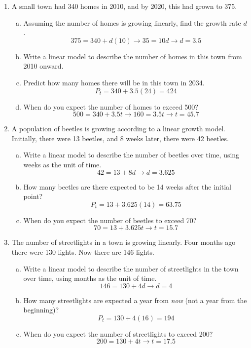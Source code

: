 \begin{enumerate}
\item A small town had 340 homes in 2010, and by 2020, this had grown to 375.
\begin{enumerate}[(a)]
\item Assuming the number of homes is growing linearly, find the growth rate $d$. 
\[375 = 340 + d(10) \longrightarrow 35 = 10d \longrightarrow d = 3.5\]
\item Write a linear model to describe the number of homes in this town from 2010 onward. 
\item Predict how many homes there will be in this town in 2034. 
\[P_t = 340 + 3.5(24) = 424\]
\item When do you expect the number of homes to exceed 500? 
\[500 = 340 + 3.5t \longrightarrow 160 = 3.5t \longrightarrow t = 45.7\]
\end{enumerate}

\item A population of beetles is growing according to a linear growth model.  Initially, there were 13 beetles, and 8 weeks later, there were 42 beetles.
\begin{enumerate}[(a)]
\item Write a linear model to describe the number of beetles over time, using weeks as the unit of time. 
\[42 = 13 + 8d \longrightarrow d = 3.625\]
\item How many beetles are there expected to be 14 weeks after the initial point? 
\[P_t = 13 + 3.625(14) = 63.75\]
\item When do you expect the number of beetles to exceed 70? 
\[70 = 13 + 3.625t \longrightarrow t = 15.7\]
\end{enumerate}

\item The number of streetlights in a town is growing linearly.  Four months ago there were 130 lights.  Now there are 146 lights.
\begin{enumerate}[(a)]
\item Write a linear model to describe the number of streetlights in the town over time, using months as the unit of time. 
\[146 = 130 + 4d \longrightarrow d = 4\]
\item How many streetlights are expected a year from \emph{now} (not a year from the beginning)? 
\[P_t = 130 + 4(16) = 194\]
\item When do you expect the number of streetlights to exceed 200? 
\[200 = 130 + 4t \longrightarrow t = 17.5\]
\end{enumerate}


\end{enumerate}
